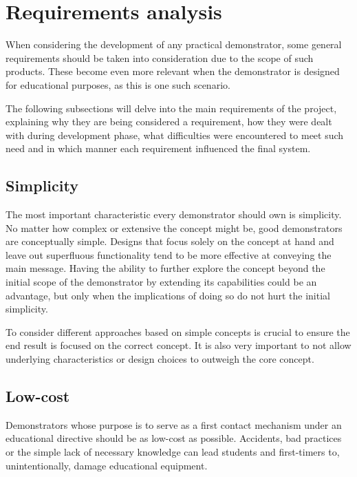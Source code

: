 \section{Requirements analysis} \label{sec:requirements}


When considering the development of any practical demonstrator, some general requirements should be taken into consideration due to the scope of such products.
These become even more relevant when the demonstrator is designed for educational purposes, as this is one such scenario.

The following subsections will delve into the main requirements of the project, explaining why they are being considered a requirement, how they were dealt with during development phase, what difficulties were encountered to meet such need and in which manner each requirement influenced the final system.

\subsection{Simplicity}

The most important characteristic every demonstrator should own is simplicity.
No matter how complex or extensive the concept might be, good demonstrators are conceptually simple.
Designs that focus solely on the concept at hand and leave out superfluous functionality tend to be more effective at conveying the main message.
Having the ability to further explore the concept beyond the initial scope of the demonstrator by extending its capabilities could be an advantage, but only when the implications of doing so do not hurt the initial simplicity.

To consider different approaches based on simple concepts is crucial to ensure the end result is focused on the correct concept.
It is also very important to not allow underlying characteristics or design choices to outweigh the core concept.

\subsection{Low-cost} \label{sec:low-cost}

Demonstrators whose purpose is to serve as a first contact mechanism under an educational directive should be as low-cost as possible.
Accidents, bad practices or the simple lack of necessary knowledge can lead students and first-timers to, unintentionally, damage educational equipment.

